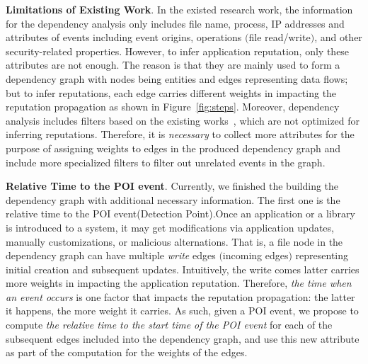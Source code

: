 \textbf{Limitations of Existing Work}.
In the existed research work, the information for the dependency analysis only includes file name, process, IP addresses and attributes of events including event origins, operations $($file read/write$)$, and other security-related properties. However, to infer application reputation, only these attributes are not enough.
The reason is that they are mainly used to form a dependency graph with nodes being entities and edges representing data flows;
but to infer reputations, each edge carries different weights in impacting the reputation propagation as shown in Figure~\ref{fig:steps}.
Moreover, dependency analysis includes filters based on the existing works~\cite{backtracking,backtracking2}, which are not optimized for inferring reputations.
Therefore, it is \emph{necessary} to collect more attributes for the purpose of assigning weights to edges in the produced dependency graph and include more specialized filters to filter out unrelated events in the graph. 

\textbf{Relative Time to the POI event}.
Currently, we finished the building the dependency graph with additional necessary information. The first one is the relative time to the POI event(Detection Point).Once an application or a library is introduced to a system, it may get modifications via application updates, manually customizations, or malicious alternations. 
That is, a file node in the dependency graph can have multiple \emph{write} edges $($incoming edges$)$ representing initial creation and subsequent updates.
Intuitively, the write comes latter carries more weights in impacting the application reputation.
Therefore, \emph{the time when an event occurs} is one factor that impacts the reputation propagation: the latter it happens, the more weight it carries.
As such, given a POI event, we propose to compute \emph{the relative time to the start time of the POI event} for each of the subsequent edges included into the dependency graph,
and use this new attribute as part of the computation for the weights of the edges. 

